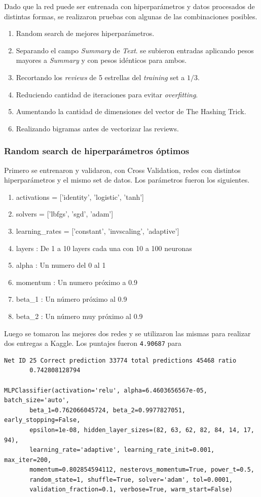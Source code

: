 \documentclass[10pt,a4paper]{article}
\begin{document}
Dado que la red puede ser entrenada con hiperparámetros y datos procesados de distintas formas, se realizaron pruebas con algunas de las combinaciones posibles.
\begin{enumerate}
    \item Random search de mejores hiperparámetros.
    \item Separando el campo \textit{Summary} de \textit{Text}. se subieron entradas aplicando pesos mayores a \textit{Summary} y con pesos idénticos para ambos.
    \item Recortando los \textit{reviews} de 5 estrellas del \textit{training} set a $1/3$.
    \item Reduciendo cantidad de iteraciones para evitar \textit{overfitting}.
    \item Aumentando la cantidad de dimensiones del vector de The Hashing Trick.
    \item Realizando bigramas antes de vectorizar las reviews.
\end{enumerate}

\subsubsection{Random search de hiperparámetros óptimos}
Primero se entrenaron y validaron, con Cross Validation, redes con distintos hiperparámetros y el mismo set de datos. Los parámetros fueron los siguientes.

\begin{enumerate}
    \item activations = ['identity', 'logistic', 'tanh']
    \item solvers = ['lbfgs', 'sgd', 'adam']
    \item learning\_rates = ['constant', 'invscaling', 'adaptive']
    \item layers : De 1 a 10 layers cada una con 10 a 100 neuronas
    \item alpha : Un numero del 0 al 1
    \item momentum : Un numero próximo a 0.9
    \item beta\_1 : Un número próximo al 0.9
    \item beta\_2 : Un número muy próximo al 0.9
\end{enumerate}


Luego se tomaron las mejores dos redes y se utilizaron las mismas para realizar dos entregas a Kaggle.
Los puntajes fueron \texttt{4.90687} para 

\begin{lstlisting}
Net ID 25 Correct prediction 33774 total predictions 45468 ratio 
       0.742808128794

MLPClassifier(activation='relu', alpha=6.4603656567e-05, batch_size='auto',
       beta_1=0.762066045724, beta_2=0.9977827051, early_stopping=False,
       epsilon=1e-08, hidden_layer_sizes=(82, 63, 62, 82, 84, 14, 17, 94),
       learning_rate='adaptive', learning_rate_init=0.001, max_iter=200,
       momentum=0.802854594112, nesterovs_momentum=True, power_t=0.5,
       random_state=1, shuffle=True, solver='adam', tol=0.0001,
       validation_fraction=0.1, verbose=True, warm_start=False)
\end{lstlisting}
\end{document}

